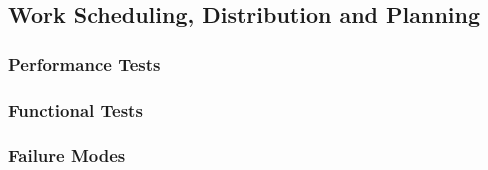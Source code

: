 
\subsection{Work Scheduling, Distribution and Planning}
\label{sec:verification_sdp}

\subsubsection{Performance Tests}
\label{sec:sdp_pt}

\subsubsection{Functional Tests}
\label{sec:sdp_ft}

\subsubsection{Failure Modes}
\label{sec:sdp_fm}
